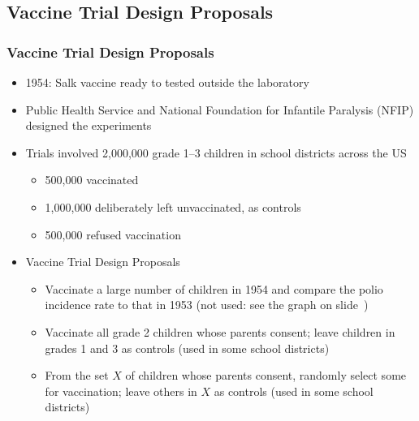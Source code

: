 \documentclass[t,xcolor=pst,dvips]{beamer}
\begin{document}
\subsection{Vaccine Trial Design Proposals}
\begin{frame}[t]\frametitle{Vaccine Trial Design Proposals}
{\small 

\begin{itemize}
\item 1954: Salk vaccine ready to tested outside the laboratory
\item Public Health Service and National Foundation for Infantile Paralysis (NFIP) 
  designed the experiments
\item Trials involved 2,000,000 grade 1--3 children in school districts across the US
   \begin{itemize}
      \item 500,000 vaccinated
      \item 1,000,000 deliberately left unvaccinated, as controls
      \item 500,000 refused vaccination
   \end{itemize}
\item Vaccine Trial Design Proposals
   \begin{itemize}
   \item Vaccinate a large number of children in 1954 and compare the polio incidence rate to that in 1953
          (not used:  see the graph on slide~\pageref{polio})
   \item Vaccinate all grade 2 children whose parents consent; leave children in grades 1 and 3 as controls
          (used in some school districts)
   \item From the set $X$ of children whose parents consent, randomly select some for vaccination; leave
         others in $X$ as controls
         (used in some school districts)
   \end{itemize}
\end{itemize}}

\end{frame}
\end{document}

